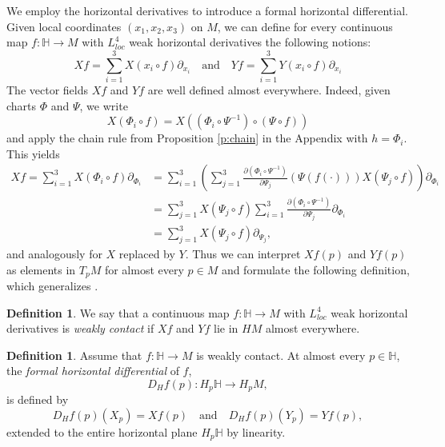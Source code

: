 \documentclass[10pt,letterpaper]{amsart}
\theoremstyle{definition}
\newtheorem{definition}[thm]{Definition}
\numberwithin{thm}{subsection}
\numberwithin{equation}{section}
\begin{document}
We employ the horizontal derivatives to introduce a formal horizontal differential.
Given local coordinates $(x_1,x_2,x_3)$ on $M$, we can define for
every continuous map $f:{\mathbb H} \to M$ with $L^4_{loc}$ weak
horizontal derivatives the following notions:
\begin{equation}\label{eq:def_Xf_Yf}
 Xf =\sum_{i=1}^3X (x_i \circ f)\partial_{x_i} \quad \text{and}
 \quad
Yf =\sum_{i=1}^3Y (x_i \circ f)\partial_{x_i}
\end{equation}
The vector fields $Xf$ and $Yf$ are well defined almost
everywhere. Indeed, given charts $\Phi$ and $\Psi$, we write
\begin{displaymath}
X(\Phi_i \circ f) = X((\Phi_i \circ \Psi^{-1})\circ (\Psi \circ f))
\end{displaymath}
and apply the chain rule from Proposition \ref{p:chain} in the
Appendix with $h=\Phi_i $. This yields
\begin{align*}
Xf = \sum_{i=1}^3 X(\Phi_i \circ f) \partial_{\Phi_i}&=
\sum_{i=1}^3 \left( \sum_{j=1}^3 \frac{\partial (\Phi_i \circ
\Psi^{-1})}{\partial \Psi_j}(\Psi(f(\cdot))) X(\Psi_j \circ f)
\right)
\partial_{\Phi_i}\\
&= \sum_{j=1}^3 X(\Psi_j \circ f) \sum_{i=1}^3 \frac{\partial
(\Phi_i \circ \Psi^{-1})}{\partial \Psi_j}\partial_{\Phi_i}\\
&= \sum_{j=1}^3 X(\Psi_j \circ f) \partial_{\Psi_j},
\end{align*}
and analogously for $X$ replaced by $Y$. Thus we can interpret $Xf(p)$ and $Yf(p)$ as elements in $T_p M$ for almost every $p\in M$ and formulate the following definition, which generalizes \cite[Definition 1.1]{Da}.

\begin{definition}
We say that a continuous map $f:{\mathbb H} \to M$ with $L^4_{loc}$ weak horizontal derivatives is \emph{weakly contact} if $Xf$ and $Yf$ lie in $HM$ almost everywhere.
\end{definition}

\begin{definition}
Assume that $f:{\mathbb H} \to M$ is weakly contact. At almost every $p\in {\mathbb H}$, the \emph{formal horizontal differential} of $f$,
\begin{displaymath}
D_H f(p): H_p {\mathbb H} \to H_p M,
\end{displaymath}
is defined by
\begin{equation}\label{eq:def_diff}
D_H f(p) (X_p) = Xf(p)\quad\text{and} \quad  D_H f(p) (Y_p) = Y f(p),
\end{equation}
extended to the entire horizontal plane $H_p {\mathbb H}$ by linearity.
\end{definition}
\end{document}
